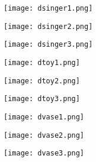 \documentclass{article}
\begin{document}
\vspace{-0.7cm}

\begin{figure}[!htb]
    \centering
    \begin{subfigure}{0.3\textwidth}
        \centering
        \texttt{[image: dsinger1.png]}
    \end{subfigure}
    \begin{subfigure}{0.3\textwidth}
        \centering
        \texttt{[image: dsinger2.png]}
    \end{subfigure}
    \begin{subfigure}{0.3\textwidth}
        \centering
        \texttt{[image: dsinger3.png]}
    \end{subfigure}
\end{figure}

\vspace{-0.7cm}

\begin{figure}[!htb]
    \centering
    \begin{subfigure}{0.3\textwidth}
        \centering
        \texttt{[image: dtoy1.png]}
    \end{subfigure}
    \begin{subfigure}{0.3\textwidth}
        \centering
        \texttt{[image: dtoy2.png]}
    \end{subfigure}
    \begin{subfigure}{0.3\textwidth}
        \centering
        \texttt{[image: dtoy3.png]}
    \end{subfigure}
\end{figure}

\vspace{-0.7cm}

\begin{figure}[!htb]
    \centering
    \begin{subfigure}{0.3\textwidth}
        \centering
        \texttt{[image: dvase1.png]}
    \end{subfigure}
    \begin{subfigure}{0.3\textwidth}
        \centering
        \texttt{[image: dvase2.png]}
    \end{subfigure}
    \begin{subfigure}{0.3\textwidth}
        \centering
        \texttt{[image: dvase3.png]}
    \end{subfigure}
\end{figure}
\end{document}

